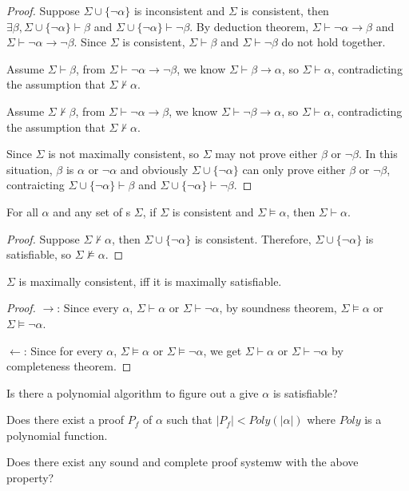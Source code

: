 \begin{proof}
Suppose $\Sigma\cup\{\neg\alpha\}$ is inconsistent and $\Sigma$ is consistent, then $\exists\beta, \Sigma\cup\{\neg\alpha\}\vdash\beta$ and $\Sigma\cup\{\neg\alpha\}\vdash\neg\beta$.
By deduction theorem, $\Sigma\vdash\neg\alpha\rightarrow\beta$ and $\Sigma\vdash\neg\alpha\rightarrow\neg\beta$.
Since $\Sigma$ is consistent, $\Sigma\vdash\beta$ and $\Sigma\vdash\neg\beta$ do not hold together.

Assume $\Sigma\vdash\beta$, from $\Sigma\vdash\neg\alpha\rightarrow\neg\beta$, we know $\Sigma\vdash\beta\rightarrow\alpha$, so $\Sigma\vdash\alpha$, contradicting the assumption that $\Sigma\nvdash\alpha$.

Assume $\Sigma\nvdash\beta$, from $\Sigma\vdash\neg\alpha\rightarrow\beta$, we know $\Sigma\vdash\neg\beta\rightarrow\alpha$, so $\Sigma\vdash\alpha$, contradicting the assumption that $\Sigma\nvdash\alpha$.

Since $\Sigma$ is not maximally consistent, so $\Sigma$ may not prove either $\beta$ or $\neg\beta$. In this situation, $\beta$ is $\alpha$ or $\neg\alpha$ and obviously $\Sigma\cup\{\neg\alpha\}$ can only prove either $\beta$ or $\neg\beta$, contraicting $\Sigma\cup\{\neg\alpha\}\vdash\beta$ and $\Sigma\cup\{\neg\alpha\}\vdash\neg\beta$.

\end{proof}

\begin{theorem} [Completeness]
  For all $\alpha$ and any set of \wff s $\Sigma$, if $\Sigma$ is consistent and $\Sigma\vDash\alpha$, then $\Sigma\vdash\alpha$.
\end{theorem}

\begin{proof}
Suppose $\Sigma\nvdash\alpha$, then $\Sigma\cup\{\neg\alpha\}$ is consistent.
Therefore, $\Sigma\cup\{\neg\alpha\}$ is satisfiable, so $\Sigma\nvDash\alpha$.
\end{proof}

\begin{corollary}
$\Sigma$ is maximally consistent, iff it is maximally satisfiable.
\end{corollary}

\begin{proof}

$\rightarrow$:
Since every $\alpha$, $\Sigma\vdash\alpha$ or $\Sigma\vdash\neg\alpha$, by soundness theorem, $\Sigma\vDash\alpha$ or $\Sigma\vDash\neg\alpha$.

$\leftarrow$:
Since for every $\alpha$, $\Sigma\vDash\alpha$ or $\Sigma\vDash\neg\alpha$, we get $\Sigma\vdash\alpha$ or $\Sigma\vdash\neg\alpha$ by completeness theorem.
\end{proof}

\begin{mdframed}

Is there a polynomial algorithm to figure out a give $\alpha$ is satisfiable?

Does there exist a proof $P_f$ of $\alpha$ such that $|P_f|<Poly(|\alpha|)$ where $Poly$ is a polynomial function.

Does there exist any sound and complete proof systemw with the above property?

\end{mdframed}
